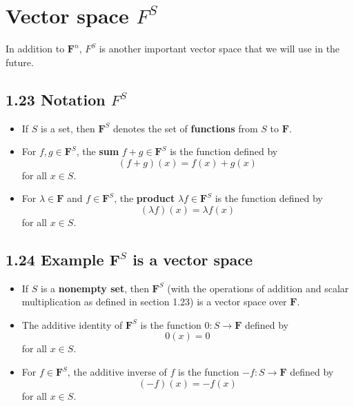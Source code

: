\documentclass[12pt, letterpaper, oneside]{book}
\begin{document}
\section{Vector space $F^S$}

In addition to $\mathbf{F}^n$, $F^S$ is another important vector space that we
will use in the future.

\subsection{1.23 Notation $F^S$}

\begin{itemize}
  \item If $S$ is a set, then $\mathbf{F}^S$ denotes the set of
    \textbf{functions} from $S$ to $\mathbf{F}$.
  \item For $f,g \in \mathbf{F}^S$, the \textbf{sum} $f + g \in \mathbf{F}^S$
    is the function defined by
      \[ (f + g)(x) = f(x) + g(x) \]
    for all $x \in S$.
  \item For $\lambda \in \mathbf{F}$ and $f \in \mathbf{F}^S$, the
    \textbf{product} $\lambda f \in \mathbf{F}^S$ is the function defined by
      \[ (\lambda f)(x) = \lambda f(x) \]
    for all $x \in S$.
\end{itemize}

\subsection{1.24 Example $\mathbf{F}^S$ is a vector space}

\begin{itemize}
  \item If $S$ is a \textbf{nonempty set}, then $\mathbf{F}^S$ (with the
   operations of addition and scalar multiplication as defined in section 1.23)
   is a vector space over $\mathbf{F}$.
  \item The additive identity of $\mathbf{F}^S$ is the function $0:
    S \rightarrow \mathbf{F}$ defined by
      \[ 0(x) = 0 \]
    for all $x \in S$.
  \item For $f \in \mathbf{F}^S$, the additive inverse of $f$ is the function
    $-f: S \rightarrow \mathbf{F}$ defined by
      \[ (-f)(x) = -f(x) \]
    for all $x \in S$.
\end{itemize}
\end{document}

